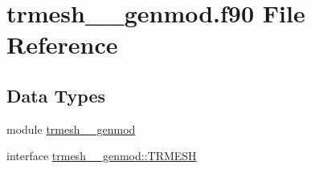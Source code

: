 \hypertarget{trmesh____genmod_8f90}{\section{trmesh\+\_\+\+\_\+genmod.\+f90 File Reference}
\label{trmesh____genmod_8f90}
}
\subsection*{Data Types}
\begin{DoxyCompactItemize}
\item 
module \hyperlink{classtrmesh____genmod}{trmesh\+\_\+\+\_\+genmod}
\item 
interface \hyperlink{interfacetrmesh____genmod_1_1TRMESH}{trmesh\+\_\+\+\_\+genmod\+::\+T\+R\+M\+E\+S\+H}
\end{DoxyCompactItemize}
